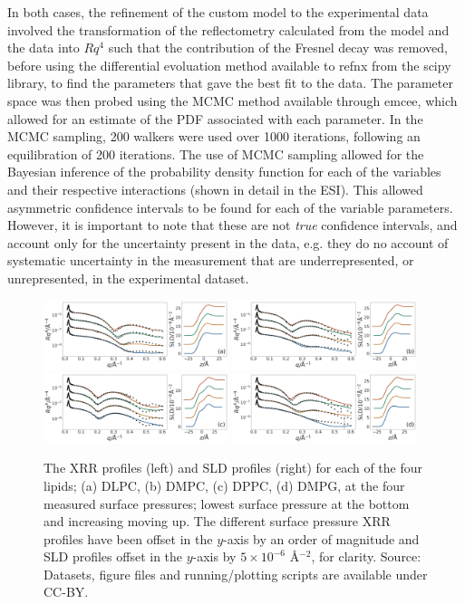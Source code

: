 \documentclass[twoside,twocolumn,9pt]{article}
\begin{document}
In both cases, the refinement of the custom model to the experimental data involved the transformation of the reflectometry calculated from the model and the data into $Rq^4$ such that the contribution of the Fresnel decay was removed, before using the differential evoluation method available to refnx from the scipy library,\cite{Jones2001} to find the parameters that gave the best fit to the data. The parameter space was then probed using the MCMC method available through emcee,\cite{Foreman-Mackey2013} which allowed for an estimate of the PDF associated with each parameter. In the MCMC sampling, 200 walkers were used over 1000 iterations, following an equilibration of 200 iterations. The use of MCMC sampling allowed for the Bayesian inference of the probability density function for each of the variables and their respective interactions (shown in detail in the ESI). This allowed asymmetric confidence intervals to be found for each of the variable parameters. However, it is important to note that these are not \emph{true} confidence intervals, and account only for the uncertainty present in the data, e.g. they do no account of systematic uncertainty in the measurement that are underrepresented, or unrepresented, in the experimental dataset.

%
\begin{figure}
	\centering
	\includegraphics[width=0.48\textwidth]{figures/DLPC_all_data}
	\includegraphics[width=0.48\textwidth]{figures/DMPC_all_data}
	\includegraphics[width=0.48\textwidth]{figures/DPPC_all_data}
	\includegraphics[width=0.48\textwidth]{figures/DMPG_all_data}
	\caption{The XRR profiles (left) and SLD profiles (right) for each of the four lipids; (a) DLPC, (b) DMPC, (c) DPPC, (d) DMPG, at the four measured surface pressures; lowest surface pressure at the bottom and increasing moving up. The different surface pressure XRR profiles have been offset in the $y$-axis by an order of magnitude and SLD profiles offset in the $y$-axis by $5\times10^{-6}$ \AA$^{-2}$, for clarity. Source: Datasets, figure files and running/plotting scripts are available under CC-BY.\cite{mccluskey_2018}}
	\label{fig:lipids}
\end{figure}
%
\end{document}
